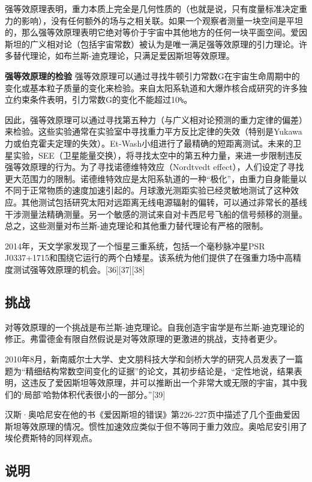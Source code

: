 强等效原理表明，重力本质上完全是几何性质的（也就是说，只有度量标准决定重力的影响），没有任何额外的场与之相关联。如果一个观察者测量一块空间是平坦的，那么强等效原理表明它绝对等价于宇宙中其他地方的任何一块平面空间。爱因斯坦的广义相对论（包括宇宙常数）被认为是唯一满足强等效原理的引力理论。许多替代理论，如布兰斯-迪克理论，只满足爱因斯坦等效原理。

\textbf{强等效原理的检验}
强等效原理可以通过寻找牛顿引力常数G在宇宙生命周期中的变化或基本粒子质量的变化来检验。来自太阳系轨道和大爆炸核合成研究的许多独立约束条件表明，引力常数G的变化不能超过10\verb|%|。

因此，强等效原理可以通过寻找第五种力（与广义相对论预测的重力定律的偏差）来检验。这些实验通常在实验室中寻找重力平方反比定律的失效（特别是Yukawa力或伯克霍夫定理的失效）。Et-Wash小组进行了最精确的短距离测试。未来的卫星实验，SEE（卫星能量交换），将寻找太空中的第五种力量，来进一步限制违反强等效原理的行为。为了寻找诺德维特效应（Nordtvedt effect），人们设定了寻找更大范围力的限制。诺德维特效应是太阳系轨道的一种“极化”，由重力自身能量以不同于正常物质的速度加速引起的。月球激光测距实验已经灵敏地测试了这种效应。其他测试包括研究太阳对远距离无线电源辐射的偏转，可以通过非常长的基线干涉测量法精确测量。另一个敏感的测试来自对卡西尼号飞船的信号频移的测量。总之，这些测量对布兰斯-迪克理论和其他重力替代理论有严格的限制。

2014年，天文学家发现了一个恒星三重系统，包括一个毫秒脉冲星PSR J0337+1715和围绕它运行的两个白矮星。该系统为他们提供了在强重力场中高精度测试强等效原理的机会。[36][37][38]

\subsection{挑战}

对等效原理的一个挑战是布兰斯-迪克理论。自我创造宇宙学是布兰斯-迪克理论的修正。弗雷德金有限自然假说是对等效原理的更激进的挑战，支持者更少。

2010年8月，新南威尔士大学、史文朋科技大学和剑桥大学的研究人员发表了一篇题为“精细结构常数空间变化的证据”的论文，其初步结论是，“定性地说，结果表明，这违反了爱因斯坦等效原理，并可以推断出一个非常大或无限的宇宙，其中我们的‘局部’哈勃体积代表很小的一部分。”[39]

汉斯·奥哈尼安在他的书《爱因斯坦的错误》第226-227页中描述了几个歪曲爱因斯坦等效原理的情况。惯性加速效应类似于但不等同于重力效应。奥哈尼安引用了埃伦费斯特的同样观点。

\subsection{说明}

